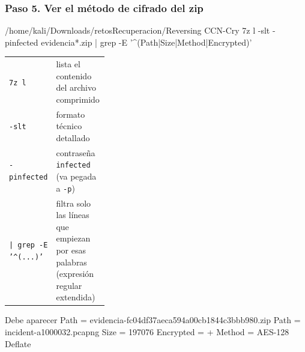 \documentclass[11pt,a4paper]{article}
\begin{document}
\subsubsection*{Paso 5. Ver el método de cifrado del zip}
\begin{comando}{/home/kali/Downloads/retosRecuperacion/Reversing CCN-Cry}
7z l -slt -pinfected evidencia*.zip | grep -E '^(Path|Size|Method|Encrypted)'
\end{comando}
\begin{tcolorbox}[enhanced, breakable, colback=gray!3, colframe=gray!35, boxrule=0.3pt, arc=1pt, left=4pt, right=4pt, top=2pt, bottom=2pt, fonttitle=\sffamily\scriptsize\bfseries, coltitle=black!70, colbacktitle=gray!10, title={Qué hace cada parte}, attach title to upper, before skip=2pt, after skip=4pt, fontupper=\small]
\par{\renewcommand{\arraystretch}{1.12}\begin{tabularx}{\linewidth}{@{}>{\raggedright\arraybackslash}p{0.33\linewidth}>{\raggedright\arraybackslash}X@{}}
\texttt{7z l} & lista el contenido del archivo comprimido \\
\texttt{-slt} & formato técnico detallado \\
\texttt{-pinfected} & contraseña \texttt{infected} (va pegada a \texttt{-p}) \\
\texttt{|\allowbreak{} grep -E '\^{}(...)'} & filtra solo las líneas que empiezan por esas palabras (expresión regular extendida) \\
\end{tabularx}}
\end{tcolorbox}
\begin{salida}{Debe aparecer}
Path = evidencia-fc04df37aeca594a00cb1844c3bbb980.zip
Path = incident-a1000032.pcapng
Size = 197076
Encrypted = +
Method = AES-128 Deflate
\end{salida}
\end{document}
